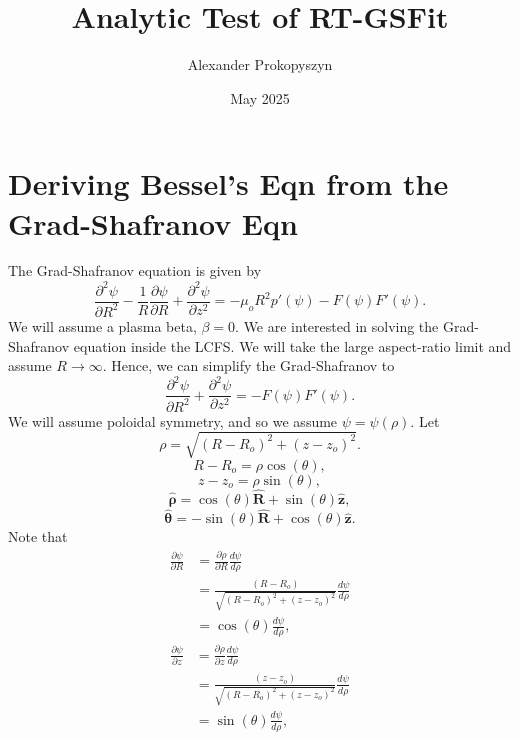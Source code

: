 \documentclass{article}
\title{Analytic Test of RT-GSFit}
\author{Alexander Prokopyszyn}
\date{May 2025}
\begin{document}
\maketitle

\section{Deriving Bessel's Eqn from the Grad-Shafranov Eqn}

The Grad-Shafranov equation is given by
\[\frac{\partial^2 \psi}{\partial R^2} - \frac{1}{R}\frac{\partial \psi}{\partial R} + \frac{\partial^2 \psi}{\partial z^2} = -\mu_oR^2p'(\psi) - F(\psi)F'(\psi).\]
We will assume a plasma beta, $\beta=0$. We are interested in solving the Grad-Shafranov equation inside the LCFS. 
We will take the large aspect-ratio limit and assume $R\rightarrow \infty$.
Hence, we can simplify the Grad-Shafranov to
\[\frac{\partial^2 \psi}{\partial R^2} + \frac{\partial^2 \psi}{\partial z^2} = -F(\psi)F'(\psi).\]
We will assume poloidal symmetry, and so we assume $\psi=\psi(\rho)$.
Let
\[\rho = \sqrt{(R-R_o)^2+(z-z_o)^2}.\]
\[R-R_o = \rho\cos(\theta),\]
\[z-z_o = \rho \sin(\theta),\]
\[\mathbf{\hat{\rho}} = \cos(\theta) \mathbf{\hat{R}} + \sin(\theta)\mathbf{\hat{z}},\]
\[\mathbf{\hat{\theta}} = -\sin(\theta) \mathbf{\hat{R}} + \cos(\theta)\mathbf{\hat{z}}.\]
Note that
\[\begin{aligned}
\frac{\partial \psi}{\partial R} &= \frac{\partial \rho}{\partial R}\frac{d \psi}{d \rho} \\
&= \frac{(R-R_o)}{\sqrt{(R-R_o)^2+(z-z_o)^2}}\frac{d \psi}{d \rho} \\
&= \cos(\theta)\frac{d \psi}{d \rho},
\end{aligned}\]
\[\begin{aligned}
\frac{\partial \psi}{\partial z} &= \frac{\partial \rho}{\partial z}\frac{d \psi}{d \rho} \\
&= \frac{(z-z_o)}{\sqrt{(R-R_o)^2+(z-z_o)^2}}\frac{d \psi}{d \rho} \\
&= \sin(\theta)\frac{d \psi}{d \rho},
\end{aligned}\]
\end{document}
